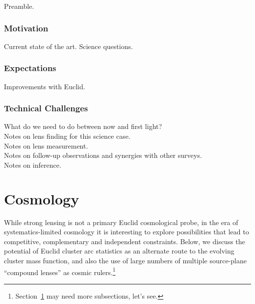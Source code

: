\documentclass[twocolumn]{svjour3}
\begin{document}


Preamble.

\subsubsection{Motivation}
Current state of the art. Science questions.\\

\subsubsection{Expectations}
Improvements with Euclid.\\

\subsubsection{Technical Challenges}

What do we need to do between now and first light?\\

Notes on lens finding for this science case.\\

Notes on lens measurement.\\

Notes on follow-up observations and synergies with other surveys.\\

Notes on inference.\\



\section{Cosmology}
\label{sec:cosmology}



While strong lensing is not a primary Euclid cosmological probe, in the
era of systematics-limited cosmology it is interesting to explore
possibilities that lead to competitive, complementary and independent
constraints. Below, we discuss the potential of Euclid cluster arc
statistics as an alternate route to the evolving cluster mass function,
and also the use of large numbers of multiple source-plane ``compound
lenses'' as cosmic rulers.\footnote{Section~\ref{sec:cosmology} may need
more subsections, let's see.}
\end{document}
